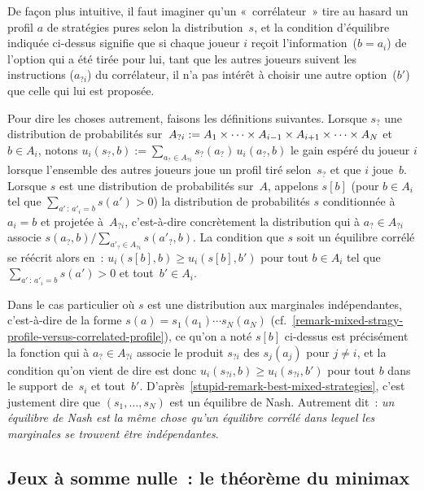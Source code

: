 \documentclass[12pt,a4paper]{article}
\theoremstyle{definition}
\begin{document}
De façon plus intuitive, il faut imaginer qu'un « corrélateur » tire
au hasard un profil $a$ de stratégies pures selon la distribution $s$,
et la condition d'équilibre indiquée ci-dessus signifie que si chaque
joueur $i$ reçoit l'information ($b = a_i$) de l'option qui a été
tirée pour lui, tant que les autres joueurs suivent les instructions
($a_{?i}$) du corrélateur, il n'a pas intérêt à choisir une autre
option ($b'$) que celle qui lui est proposée.

Pour dire les choses autrement, faisons les définitions suivantes.
Lorsque $s_{?}$ une distribution de probabilités sur $A_{?i} :=
A_1\times \cdots \penalty500 \times A_{i-1} \penalty0 \times \penalty0
A_{i+1} \times\cdots \penalty500 \times A_N$ et $b \in A_i$, notons
$u_i(s_?, b) := \sum_{a_? \in A_{?i}} s_?(a_?)\,u_i(a_?, b)$ le gain
espéré du joueur $i$ lorsque l'ensemble des autres joueurs joue un
profil tiré selon $s_?$ et que $i$ joue $b$.  Lorsque $s$ est une
distribution de probabilités sur $A$, appelons $s[b]$ (pour $b\in A_i$
tel que $\sum_{a'\,:\, a'_i=b} s(a') > 0$) la distribution de
probabilités $s$ conditionnée à $a_i = b$ et projetée à $A_{?i}$,
c'est-à-dire concrètement la distribution qui à $a_? \in A_{?i}$
associe $s(a_?, b)/\sum_{a'_? \in A_{?i}} s(a'_?, b)$.  La condition
que $s$ soit un équilibre corrélé se réécrit alors en : $u_i(s[b], b)
\geq u_i(s[b], b')$ pour tout $b\in A_i$ tel que $\sum_{a'\,:\,
  a'_i=b} s(a') > 0$ et tout $b'\in A_i$.

Dans le cas particulier où $s$ est une distribution aux marginales
indépendantes, c'est-à-dire de la forme $s(a) = s_1(a_1) \cdots
s_N(a_N)$
(cf. \ref{remark-mixed-stragy-profile-versus-correlated-profile}), ce
qu'on a noté $s[b]$ ci-dessus est précisément la fonction qui à $a_?
\in A_{?i}$ associe le produit $s_{?i}$ des $s_j(a_j)$ pour $j\neq i$,
et la condition qu'on vient de dire est donc $u_i(s_{?i}, b) \geq
u_i(s_{?i}, b')$ pour tout $b$ dans le support de $s_i$ et tout $b'$.
D'après \ref{stupid-remark-best-mixed-strategies}, c'est justement
dire que $(s_1,\ldots,s_N)$ est un équilibre de Nash.  Autrement dit :
\emph{un équilibre de Nash est la même chose qu'un équilibre corrélé
  dans lequel les marginales se trouvent être indépendantes}.



\subsection{Jeux à somme nulle : le théorème du minimax}\label{zero-sum-games}
\end{document}

